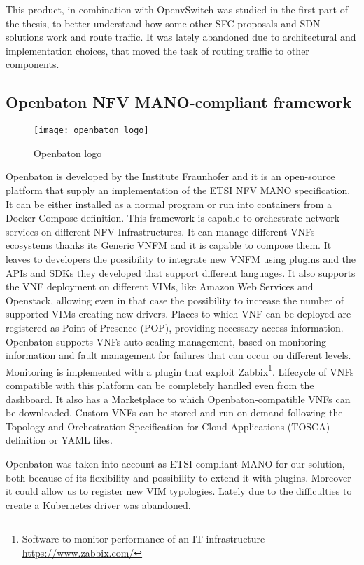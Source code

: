 This product, in combination with OpenvSwitch was studied in the first part of
the thesis, to better understand how some other SFC proposals and SDN solutions
work and route traffic. It was lately abandoned due to architectural and
implementation choices, that moved the task of routing traffic to other
components.

\subsection{Openbaton NFV MANO-compliant framework}
\begin{figure}[h]
  \centering \texttt{[image: openbaton\_logo]}
  \caption{Openbaton logo}
  \label{chap:prjan:img:openbaton_logo}
\end{figure}
Openbaton is developed by the Institute Fraunhofer and it is an open-source
platform that supply an implementation of the ETSI NFV MANO specification. It
can be either installed as a normal program or run into containers from a Docker
Compose definition. This framework is capable to orchestrate network services on
different NFV Infrastructures. It can manage different VNFs ecosystems thanks
its Generic VNFM and it is capable to compose them. It leaves to developers the
possibility to integrate new VNFM using plugins and the APIs and SDKs
they developed that support different languages. It also supports the VNF
deployment on different VIMs, like Amazon Web Services and Openstack, allowing
even in that case the possibility to increase the number of supported VIMs
creating new drivers. Places to which VNF can be deployed are registered as
Point of Presence (POP), providing necessary access information. Openbaton
supports VNFs auto-scaling management, based on monitoring information and fault
management for failures that can occur on different levels. Monitoring
is implemented with a plugin that exploit Zabbix\footnote{Software to monitor
performance of an IT infrastructure \url{https://www.zabbix.com/}}. Lifecycle of
VNFs compatible with this platform can be completely handled even from the
dashboard. It also has a Marketplace to which Openbaton-compatible VNFs can be
downloaded. Custom VNFs can be stored and run on demand following the Topology
and Orchestration Specification for Cloud Applications (TOSCA) definition or
YAML files.

Openbaton was taken into account as ETSI compliant MANO for our solution, both
because of its flexibility and possibility to extend it with plugins. Moreover
it could allow us to register new VIM typologies. Lately due to the difficulties
to create a Kubernetes driver was abandoned.


